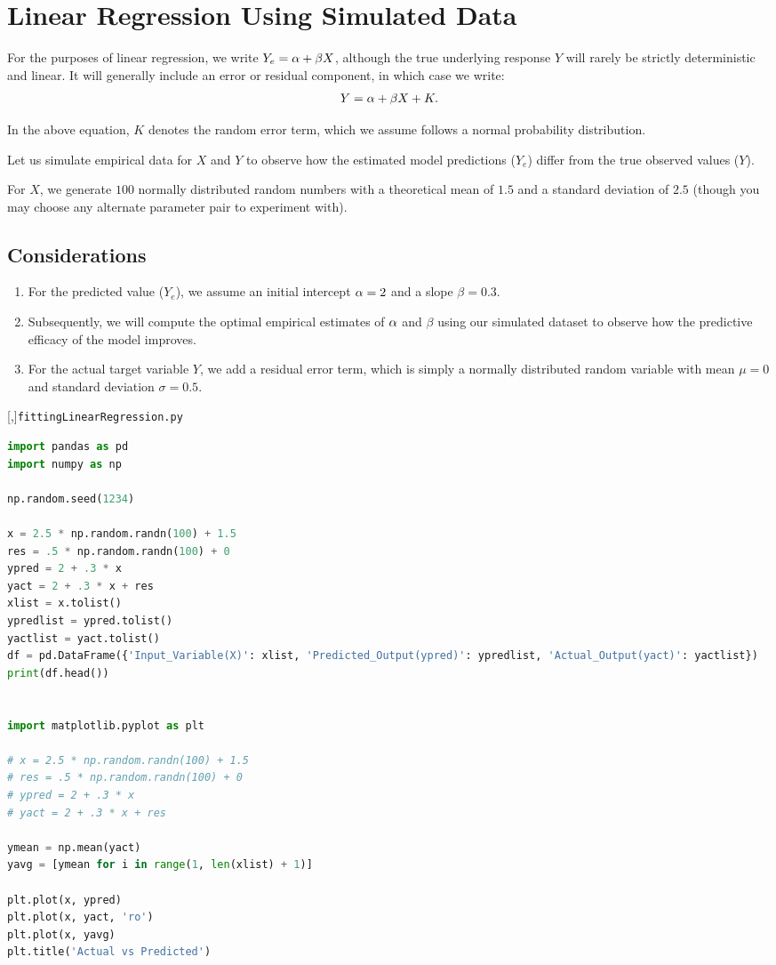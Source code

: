 \section{Linear Regression Using Simulated Data}

For the purposes of linear regression, we write $Y_e = \alpha + \beta X$, although the true underlying response $Y$ will rarely be strictly deterministic and linear. It will generally include an error or residual component, in which case we write:
\begin{align}
	Y = \alpha + \beta X + K.
\end{align}

In the above equation, $K$ denotes the random error term, which we assume follows a normal probability distribution.

Let us simulate empirical data for $X$ and $Y$ to observe how the estimated model predictions ($Y_e$) differ from the true observed values ($Y$).

For $X$, we generate $100$ normally distributed random numbers with a theoretical mean of $1.5$ and a standard deviation of $2.5$ (though you may choose any alternate parameter pair to experiment with).

\subsection{Considerations}
\begin{enumerate}
	\item For the predicted value ($Y_e$), we assume an initial intercept $\alpha = 2$ and a slope $\beta = 0.3$.
	\item Subsequently, we will compute the optimal empirical estimates of $\alpha$ and $\beta$ using our simulated dataset to observe how the predictive efficacy of the model improves.
	\item For the actual target variable $Y$, we add a residual error term, which is simply a normally distributed random variable with mean $\mu = 0$ and standard deviation $\sigma = 0.5$.
\end{enumerate}

[,]{\texttt{fittingLinearRegression.py}}
\begin{lstlisting}[language=Python]
import pandas as pd
import numpy as np

np.random.seed(1234)

x = 2.5 * np.random.randn(100) + 1.5
res = .5 * np.random.randn(100) + 0
ypred = 2 + .3 * x
yact = 2 + .3 * x + res
xlist = x.tolist()
ypredlist = ypred.tolist()
yactlist = yact.tolist()
df = pd.DataFrame({'Input_Variable(X)': xlist, 'Predicted_Output(ypred)': ypredlist, 'Actual_Output(yact)': yactlist})
print(df.head())


import matplotlib.pyplot as plt

# x = 2.5 * np.random.randn(100) + 1.5
# res = .5 * np.random.randn(100) + 0
# ypred = 2 + .3 * x
# yact = 2 + .3 * x + res

ymean = np.mean(yact)
yavg = [ymean for i in range(1, len(xlist) + 1)]

plt.plot(x, ypred)
plt.plot(x, yact, 'ro')
plt.plot(x, yavg)
plt.title('Actual vs Predicted')
\end{lstlisting}

